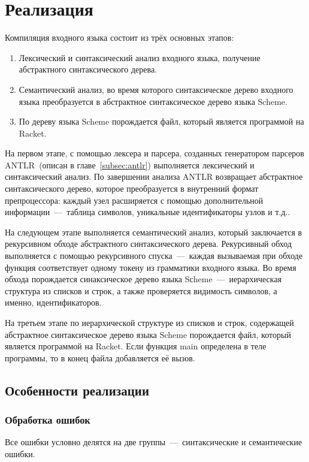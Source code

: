 \documentclass[12pt,a4paper,oneside]{extarticle}
\begin{document}
\clearpage

\section{Реализация}
    Компиляция входного языка состоит из трёх основных этапов: 
    \begin{enumerate}
        \item Лексический и синтаксический анализ входного языка, получение абстрактного синтаксического дерева.
        \item Семантический анализ, во время которого синтаксическое дерево входного языка преобразуется в абстрактное синтаксическое дерево языка Scheme.
        \item По дереву языка Scheme порождается файл, который является программой на Racket.
    \end{enumerate}

    На первом этапе, с помощью лексера и парсера, созданных генератором парсеров ANTLR~(описан в главе~\ref{subsec:antlr}) выполняется лексический и синтаксический анализ.
    По завершении анализа ANTLR возвращает абстрактное синтаксического дерево, которое преобразуется в внутренний формат препроцессора: каждый узел расширяется с помощью дополнительной информации~---~таблица символов, уникальные идентификаторы узлов и т.д..

    На следующем этапе выполняется семантический анализ, который заключается в рекурсивном обходе абстрактного синтаксического дерева.
    Рекурсивный обход выполняется с помощью рекурсивного спуска~---~каждая вызываемая при обходе функция соответствует одному токену из грамматики входного языка.
    Во время обхода порождается синаксическое дерево языка Sсheme~---~иерархическая структура из списков и строк, а также проверяется видимость символов, а именно, идентификаторов.

    На третьем этапе по иерархической структуре из списков и строк, содержащей абстрактное синтаксическое дерево языка Scheme порождается файл, который является программой на Racket.
    Если функция main определена в теле программы, то в конец файла добавляется её вызов.

    \clearpage

    \subsection{Особенности реализации}
        \subsubsection{Обработка ошибок}
            \label{subsubsec:error}
            Все ошибки условно делятся на две группы~---~синтаксические и семантические ошибки.
\end{document}
